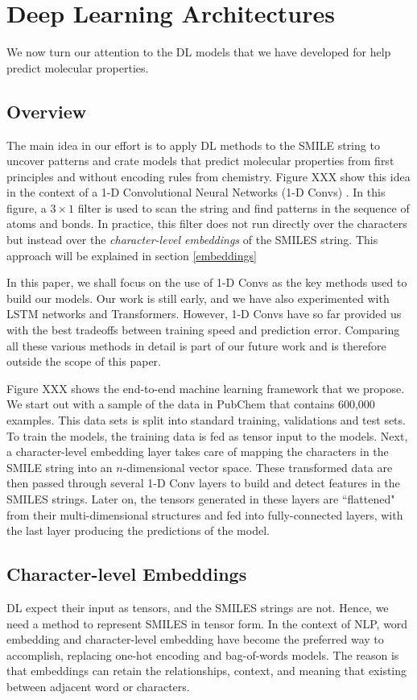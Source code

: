 \section{Deep Learning Architectures \label{archi}}
We now turn our attention to the DL models that we have developed for help predict molecular properties.
\subsection{Overview}
The main idea in our effort is to apply DL methods to the SMILE string to uncover patterns and crate models that predict molecular properties from first principles and without encoding rules from chemistry. Figure XXX show this idea in the context of a 1-D Convolutional Neural Networks (1-D Convs) . In this figure, a $3 \times 1$ filter is used to scan the string and find patterns in the sequence of atoms and bonds. In practice, this filter does not run directly over the characters but instead  over the {\em character-level embeddings}  of the SMILES string. This approach will be explained in section \ref{embeddings}


In this paper, we shall focus on the use of 1-D Convs as the key methods used to build our models. Our work is still early, and we have also experimented with LSTM networks and Transformers. However,  1-D Convs have so far provided us with the best tradeoffs between training speed and prediction error. Comparing all these various methods in detail is part of our future work and is therefore outside the scope of this paper. 

Figure XXX shows the end-to-end machine learning framework that we propose. We start out with a sample of the data in PubChem that contains 600,000 examples. This data sets is split into standard training, validations and test sets. To train the models, the training data is fed as tensor input to the models. Next, a character-level embedding layer takes care of mapping the characters in the SMILE string into an $n$-dimensional vector space. These transformed data are then passed through several 1-D Conv layers to build and detect features in the SMILES strings. Later on, the tensors generated in these layers are ``flattened" from their multi-dimensional structures and fed into fully-connected layers, with the last layer producing the predictions of the model.
\subsection{Character-level Embeddings \label{embeddings}}
DL expect their input as tensors, and the SMILES strings are not. Hence, we need a method to represent SMILES in tensor form. In the context of NLP, word embedding and character-level embedding have become the preferred way to accomplish, replacing one-hot encoding and bag-of-words models. The reason is that embeddings can retain the relationships, context, and meaning that existing between adjacent word or characters. 

